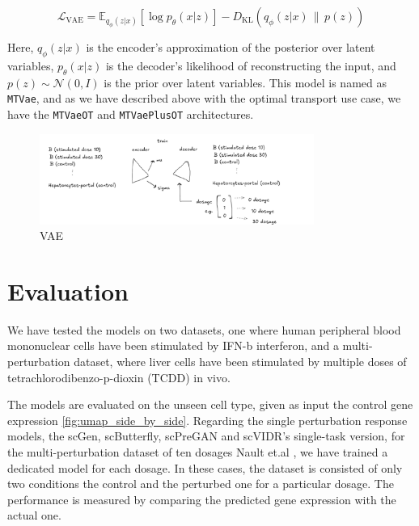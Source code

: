 \documentclass[12pt, a4paper]{article}
\begin{document}
\[
\mathcal{L}_{\text{VAE}} = \mathbb{E}_{q_\phi(z|x)}[\log p_\theta(x|z)] - D_{\text{KL}}(q_\phi(z|x) \,\|\, p(z))
\]

Here, $q_\phi(z|x)$ is the encoder's approximation of the posterior over latent variables, $p_\theta(x|z)$ is the decoder's likelihood of reconstructing the input, and $p(z) \sim \mathcal{N}(0, I)$ is the prior over latent variables. This model is named as \verb|MTVae|, and as we have described above with the optimal transport use case, we have the \verb|MTVaeOT| and \verb|MTVaePlusOT| architectures.

\begin{figure}
    \centering
    \includegraphics[width=0.8\textwidth]{vae_sketch.png}
    \caption{VAE}
\end{figure}


\section{Evaluation}



We have tested the models on two datasets, one where human peripheral blood mononuclear cells have been stimulated by IFN-b interferon, and a multi-perturbation dataset, where liver cells have been stimulated by multiple doses of tetrachlorodibenzo-p-dioxin (TCDD) in vivo.

The models are evaluated on the unseen cell type, given as input the control gene expression \cref{fig:umap_side_by_side}.
Regarding the single perturbation response models, the scGen, scButterfly, scPreGAN and scVIDR's single-task version, for the multi-perturbation dataset of ten dosages Nault et.al \cite{nault2021single,nault2022benchmarking}, we have trained a dedicated model for each dosage. In these cases, the dataset is consisted of only two conditions the control and the perturbed one for a particular dosage. The performance is measured by comparing the predicted gene expression with the actual one.
\end{document}
